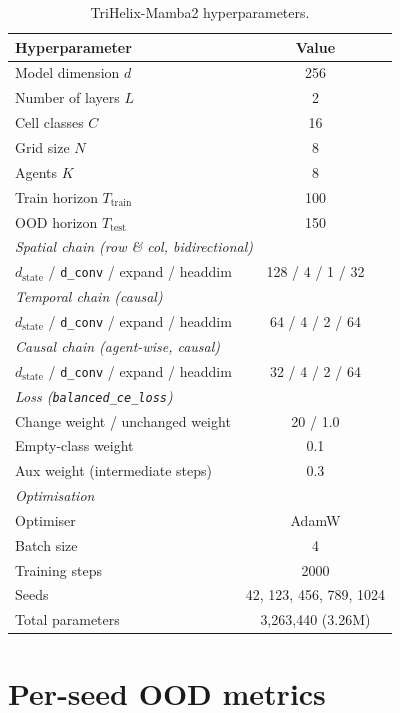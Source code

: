 \begin{table}[h]
\centering
\small
\caption{TriHelix-Mamba2 hyperparameters.}
\label{tab:hyper}
\begin{tabular}{lc}
\toprule
Hyperparameter & Value \\
\midrule
Model dimension $d$ & 256 \\
Number of layers $L$ & 2 \\
Cell classes $C$ & 16 \\
Grid size $N$ & 8 \\
Agents $K$ & 8 \\
Train horizon $T_{\text{train}}$ & 100 \\
OOD horizon $T_{\text{test}}$ & 150 \\
\midrule
\multicolumn{2}{l}{\emph{Spatial chain (row \& col, bidirectional)}} \\
$d_{\text{state}}$ / \texttt{d\_conv} / expand / headdim & 128 / 4 / 1 / 32 \\
\midrule
\multicolumn{2}{l}{\emph{Temporal chain (causal)}} \\
$d_{\text{state}}$ / \texttt{d\_conv} / expand / headdim & 64 / 4 / 2 / 64 \\
\midrule
\multicolumn{2}{l}{\emph{Causal chain (agent-wise, causal)}} \\
$d_{\text{state}}$ / \texttt{d\_conv} / expand / headdim & 32 / 4 / 2 / 64 \\
\midrule
\multicolumn{2}{l}{\emph{Loss (\texttt{balanced\_ce\_loss})}} \\
Change weight / unchanged weight & 20 / 1.0 \\
Empty-class weight & 0.1 \\
Aux weight (intermediate steps) & 0.3 \\
\midrule
\multicolumn{2}{l}{\emph{Optimisation}} \\
Optimiser & AdamW \\
Batch size & 4 \\
Training steps & 2000 \\
Seeds & 42, 123, 456, 789, 1024 \\
\midrule
Total parameters & 3,263,440 (3.26M) \\
\bottomrule
\end{tabular}
\end{table}

\section{Per-seed OOD metrics}
\label{app:seed}

